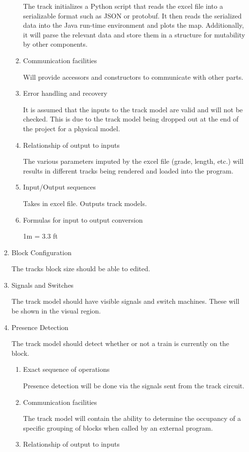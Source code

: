 \documentclass[11pt]{article}
\begin{document}
\begin{enumerate}
\begin{enumerate}
The track initializes a Python script that reads the excel file into a serializable format such as JSON or protobuf. It then reads the serialized data into the Java run-time environment and plots the map. Additionally, it will parse the relevant data and store them in a structure for mutability by other components.
\item Communication facilities
\label{sec-3-1-3-3-3}

Will provide accessors and constructors to communicate with other parts.
\item Error handling and recovery
\label{sec-3-1-3-3-4}

It is assumed that the inputs to the track model are valid and will not be checked. This is due to the track model being dropped out at the end of the project for a physical model.
\item Relationship of output to inputs
\label{sec-3-1-3-3-5}

The various parameters imputed by the excel file (grade, length, etc.) will results in different tracks being rendered and loaded into the program.
\item Input/Output sequences
\label{sec-3-1-3-3-6}

Takes in excel file. Outputs track models.
\item Formulas for input to output conversion
\label{sec-3-1-3-3-7}

1m = 3.3 ft
\end{enumerate}
\item Block Configuration
\label{sec-3-1-3-4}

The tracks block size should be able to edited.
\item Signals and Switches
\label{sec-3-1-3-5}

The track model should have visible signals and switch machines. These will be shown in the visual region.
\item Presence Detection
\label{sec-3-1-3-6}

The track model should detect whether or not a train is currently on the block.
\begin{enumerate}
\item Exact sequence of operations
\label{sec-3-1-3-6-1}

Presence detection will be done via the signals sent from the track circuit.
\item Communication facilities
\label{sec-3-1-3-6-2}

The track model will contain the ability to determine the occupancy of a specific grouping of blocks when called by an external program.
\item Relationship of output to inputs
\label{sec-3-1-3-6-3}


\end{enumerate}
\end{enumerate}
\end{document}
